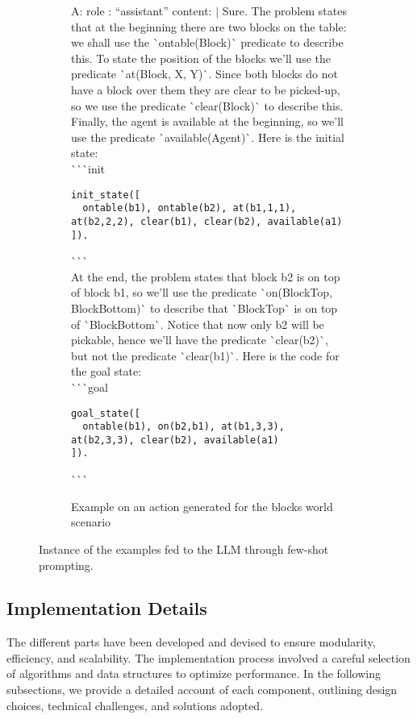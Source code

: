 \begin{figure*}[htp]
\begin{subfigure}{0.99\linewidth}
\begin{textbox}{}
A:
    role : ``assistant''
    content: $\vert$
        Sure. The problem states that at the beginning there are two blocks on the table: we shall 
        use the \`{}ontable(Block)\`{} predicate to describe this. To state the position of the blocks
        we'll use the predicate \`{}at(Block, X, Y)\`{}. Since both blocks do not have a block over them
        they are clear to be picked-up, so we use the predicate \`{}clear(Block)\`{} to describe this. 
        Finally, the agent is available at the beginning, so we'll use the predicate 
        \`{}available(Agent)\`{}.
        Here is the initial state:\\
        \`{}\`{}\`{}init
\begin{verbatim}
init_state([
  ontable(b1), ontable(b2), at(b1,1,1), at(b2,2,2), clear(b1), clear(b2), available(a1)
]).
\end{verbatim}
        \`{}\`{}\`{}\\
        At the end, the problem states that block b2 is on top of block b1, so we'll use the
        predicate \`{}on(BlockTop, BlockBottom)\`{} to describe that \`{}BlockTop\`{} is on top of 
        \`{}BlockBottom\`{}. Notice that now only b2 will be pickable, hence we'll have the predicate
        \`{}clear(b2)\`{}, but not the predicate \`{}clear(b1)\`{}. 
        Here is the code for the goal state:\\
        \`{}\`{}\`{}goal
\begin{verbatim}
goal_state([
  ontable(b1), on(b2,b1), at(b1,3,3), at(b2,3,3), clear(b2), available(a1)
]).
\end{verbatim}
        \`{}\`{}\`{}
        \end{textbox}
        \caption{Example on an action generated for the blocks world scenario}
        \label{fig:blocksExample}
    \end{subfigure}
    \caption{Instance of the examples fed to the LLM through few-shot prompting.}
    \label{fig:enter-label}
\end{figure*}


\subsection{Implementation Details}\label{ssec:implementation}

The different parts have been developed and devised to ensure
modularity, efficiency, and scalability. The implementation process
involved a careful selection of algorithms and data structures to
optimize performance. In the following subsections, we provide a
detailed account of each component, outlining design choices,
technical challenges, and solutions adopted.

